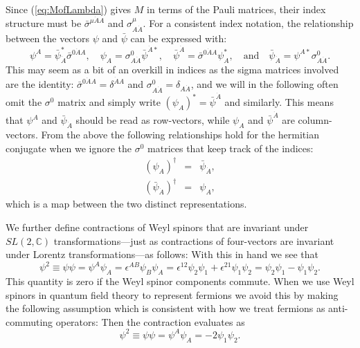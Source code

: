 \documentclass[notes.tex]{subfiles}
\begin{document}
Since (\ref{eq:MofLambda}) gives $M$ in terms of the Pauli matrices, their index structure must be $\bar{\sigma}^{\mu\dot{A}A}$ and $\sigma^\mu_{A\dot{A}}$. 
For a consistent index notation, the relationship between the vectors $\psi$ and $\bar{\psi}$ can be expressed with:
\[  \psi^A = \bar\psi_{\dot{A}}^*\bar{\sigma}^{0\dot{A}A}, \quad  \psi_A = {\sigma}^0_{A\dot{A}}\bar\psi^{\dot{A}*}, \quad  \bar{\psi}^{\dot{A}} = \bar{\sigma}^{0\dot{A}A}\psi_A^*, \quad \text{and}\quad  \bar{\psi}_{\dot{A}} =\psi^{A*} \sigma^0_{A\dot{A}} .\]
This may seem as a bit of an overkill in indices as the sigma matrices involved are the identity: $\bar{\sigma}^{0\dot{A}A} = \delta^{\dot{A}A}$ and  $\sigma^0_{A\dot{A}} = \delta_{A\dot{A}}$, and we will in the following often omit the $\sigma^0$ matrix and simply write $(\psi_A)^* = \bar{\psi}^{\dot{A}}$ and similarly. This means that $\psi^A$ and $\bar{\psi}_{\dot{A}}$ should be read as row-vectors, while $\psi_A$ and $\bar{\psi}^{\dot{A}}$ are column-vectors.
From the above the following relationships hold for the hermitian conjugate when we ignore the $\sigma^0$ matrices that keep track of the indices:
\begin{eqnarray}
(\psi_A)^\dagger &=& \bar{\psi}_{\dot{A}}, \\
(\bar{\psi}_{\dot{A}})^\dagger &=& \psi_A, \label{eq:Weyl_hc}
\end{eqnarray}
which is a map between the two distinct representations.

We further define contractions of Weyl spinors that are invariant under $SL(2,\mathbb{C})$ transformations---just as  contractions of four-vectors are invariant under Lorentz transformations---as follows:
With this in hand we see that 
\[\psi^2 \equiv \psi \psi = \psi^A\psi_A = \epsilon^{AB}\psi_B\psi_A = \epsilon^{12}\psi_2\psi_1 + \epsilon^{21}\psi_1\psi_2 = \psi_2\psi_1 - \psi_1\psi_2.\]
This quantity is zero if the Weyl spinor components commute. When we use Weyl spinors in quantum field theory to represent fermions we avoid this by making the following assumption which is consistent with how we treat fermions as anti-commuting operators:
Then the contraction evaluates as
\[\psi^2 \equiv \psi \psi = \psi^A\psi_A = -2 \psi_1\psi_2.\]
\end{document}
